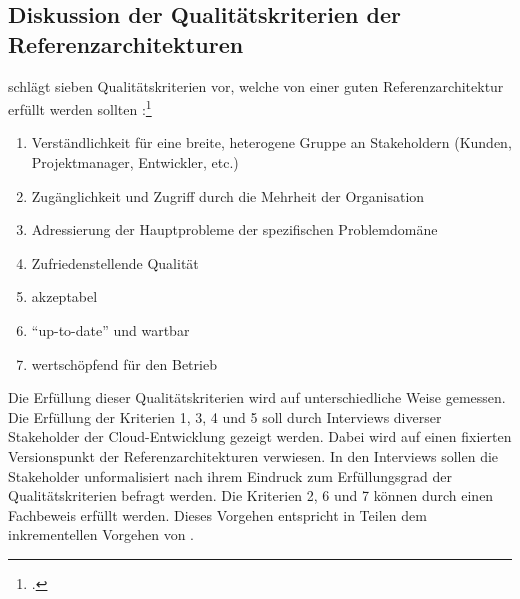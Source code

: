 \subsection{Diskussion der Qualitätskriterien der Referenzarchitekturen}\label{chap:qualitycriteria}
\citeauthor{Muller.2020} schlägt sieben Qualitätskriterien vor, welche von einer guten Referenzarchitektur erfüllt werden sollten :\footcite[Vgl. auch im Folgenden][8]{Muller.2020}
\begin{enumerate}
\item Verständlichkeit für eine breite, heterogene Gruppe an Stakeholdern (Kunden, Projektmanager, Entwickler, etc.) 
\item Zugänglichkeit und Zugriff durch die Mehrheit der Organisation 
\item Adressierung der Hauptprobleme der spezifischen Problemdomäne 
\item Zufriedenstellende Qualität 
\item akzeptabel 
\item \enquote{up-to-date} und wartbar 
\item wertschöpfend für den Betrieb 
\end{enumerate}
Die Erfüllung dieser Qualitätskriterien wird auf unterschiedliche Weise gemessen. Die Erfüllung der Kriterien 1, 3, 4 und 5 soll durch Interviews diverser Stakeholder der Cloud-Entwicklung gezeigt werden. Dabei wird auf einen fixierten Versionspunkt der Referenzarchitekturen verwiesen. In den Interviews sollen die Stakeholder unformalisiert nach ihrem Eindruck zum Erfüllungsgrad der Qualitätskriterien befragt werden. Die Kriterien 2, 6 und 7 können durch einen Fachbeweis erfüllt werden. Dieses Vorgehen entspricht in Teilen dem inkrementellen Vorgehen von \citeauthor{Muller.2020}.

